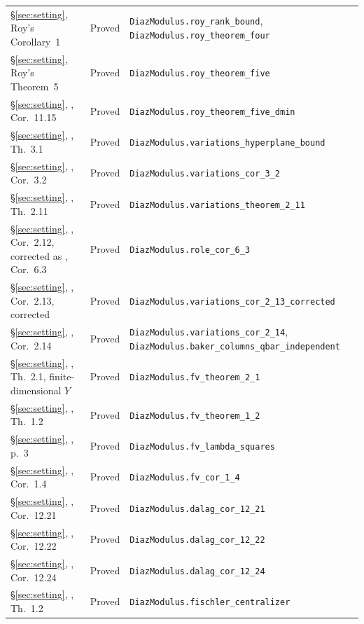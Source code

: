 \documentclass[11pt,a4paper]{article}
\theoremstyle{plain}
\theoremstyle{definition}
\begin{document}
\begin{center}
\begin{longtable}{@{}llp{6.2cm}@{}}
\S\ref{sec:setting}, Roy's Corollary~1 & Proved & \nolinkurl{DiazModulus.roy_rank_bound}, \nolinkurl{DiazModulus.roy_theorem_four} \\
\S\ref{sec:setting}, Roy's Theorem~5 & Proved & \nolinkurl{DiazModulus.roy_theorem_five} \\
\S\ref{sec:setting}, \cite{waldschmidt-book}, Cor.~11.15 & Proved & \nolinkurl{DiazModulus.roy_theorem_five_dmin} \\
\S\ref{sec:setting}, \cite{waldschmidt-2005a}, Th.~3.1 & Proved & \nolinkurl{DiazModulus.variations_hyperplane_bound} \\
\S\ref{sec:setting}, \cite{waldschmidt-2005a}, Cor.~3.2 & Proved & \nolinkurl{DiazModulus.variations_cor_3_2} \\
\S\ref{sec:setting}, \cite{waldschmidt-2005a}, Th.~2.11 & Proved & \nolinkurl{DiazModulus.variations_theorem_2_11} \\
\S\ref{sec:setting}, \cite{waldschmidt-2005a}, Cor.~2.12, corrected as \cite{waldschmidt-role}, Cor.~6.3 & Proved & \nolinkurl{DiazModulus.role_cor_6_3} \\
\S\ref{sec:setting}, \cite{waldschmidt-2005a}, Cor.~2.13, corrected & Proved & \nolinkurl{DiazModulus.variations_cor_2_13_corrected} \\
\S\ref{sec:setting}, \cite{waldschmidt-2005a}, Cor.~2.14 & Proved & \nolinkurl{DiazModulus.variations_cor_2_14}, \nolinkurl{DiazModulus.baker_columns_qbar_independent} \\
\S\ref{sec:setting}, \cite{waldschmidt-2005b}, Th.~2.1, finite-dimensional $Y$ & Proved & \nolinkurl{DiazModulus.fv_theorem_2_1} \\
\S\ref{sec:setting}, \cite{waldschmidt-2005b}, Th.~1.2 & Proved & \nolinkurl{DiazModulus.fv_theorem_1_2} \\
\S\ref{sec:setting}, \cite{waldschmidt-2005b}, p.~3 & Proved & \nolinkurl{DiazModulus.fv_lambda_squares} \\
\S\ref{sec:setting}, \cite{waldschmidt-2005b}, Cor.~1.4 & Proved & \nolinkurl{DiazModulus.fv_cor_1_4} \\
\S\ref{sec:setting}, \cite{waldschmidt-book}, Cor.~12.21 & Proved & \nolinkurl{DiazModulus.dalag_cor_12_21} \\
\S\ref{sec:setting}, \cite{waldschmidt-book}, Cor.~12.22 & Proved & \nolinkurl{DiazModulus.dalag_cor_12_22} \\
\S\ref{sec:setting}, \cite{waldschmidt-book}, Cor.~12.24 & Proved & \nolinkurl{DiazModulus.dalag_cor_12_24} \\
\S\ref{sec:setting}, \cite{fischler-2001}, Th.~1.2 & Proved & \nolinkurl{DiazModulus.fischler_centralizer} \\

\end{longtable}
\end{center}
\end{document}
